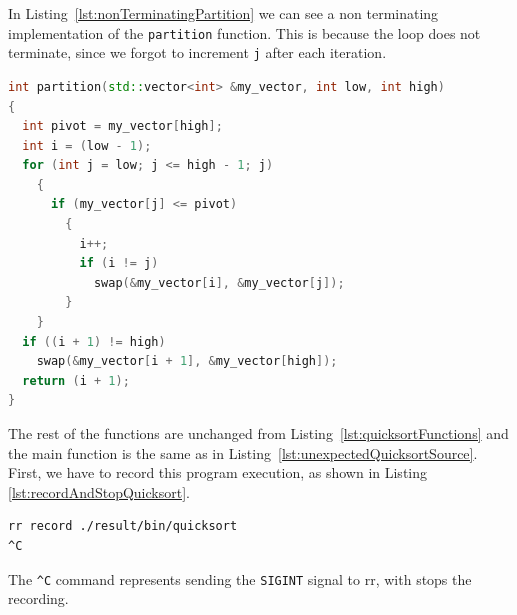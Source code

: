 In Listing~\ref{lst:nonTerminatingPartition} we can see a non terminating implementation of the \verb|partition| function. This is because the loop does not terminate, since we forgot to increment \verb|j| after each iteration.
\begin{lstlisting}[language=C++, caption={Non terminating partition implementation}, frame=p, label={lst:nonTerminatingPartition}]
int partition(std::vector<int> &my_vector, int low, int high)
{
  int pivot = my_vector[high];
  int i = (low - 1);
  for (int j = low; j <= high - 1; j)
    {
      if (my_vector[j] <= pivot)
        {
          i++;
          if (i != j)
            swap(&my_vector[i], &my_vector[j]);
        }
    }
  if ((i + 1) != high)
    swap(&my_vector[i + 1], &my_vector[high]);
  return (i + 1);
}
\end{lstlisting}
The rest of the functions are unchanged from Listing~\ref{lst:quicksortFunctions} and the main function is the same as in Listing~\ref{lst:unexpectedQuicksortSource}.
First, we have to record this program execution, as shown in Listing \ref{lst:recordAndStopQuicksort}.
\begin{lstlisting}[language=bash, caption={Starting and stoping the recording of non terminating quickSort}, frame=tb, label={lst:recordAndStopQuicksort}]
rr record ./result/bin/quicksort
^C
\end{lstlisting}
The \verb|^C| command represents sending the \verb|SIGINT| signal to rr, with stops the recording.

